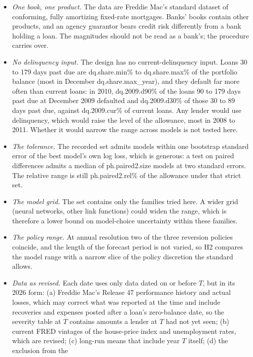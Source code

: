 \begin{itemize}[leftmargin=*, itemsep=2pt]
\item \emph{One book, one product.} The data are Freddie Mac's standard dataset
of conforming, fully amortizing fixed-rate mortgages. Banks' books contain
other products, and an agency guarantor bears credit risk differently from a
bank holding a loan. The magnitudes should not be read as a bank's; the
procedure carries over.
\item \emph{No delinquency input.} The design has no current-delinquency
input. Loans 30 to 179 days past due are \num{dq.share.min}\% to
\num{dq.share.max}\% of the portfolio balance (most in December
\num{dq.share.max_year}), and they default far more often than current loans:
in 2010, \num{dq.2009.d90}\% of the loans 90 to 179 days past due at December
2009 defaulted and \num{dq.2009.d30}\% of those 30 to 89 days past due, against
\num{dq.2009.cur}\% of current loans. Any lender would use delinquency, which
would raise the level of the allowance, most in 2008 to 2011. Whether it
would narrow the range across models is not tested here.
\item \emph{The tolerance.} The recorded set admits models within one
bootstrap standard error of the best model's own log loss, which is generous:
a test on paired differences admits a median of \num{ph.paired2.size} models at
two standard errors. The relative range is still \num{ph.paired2.rel}\% of the
allowance under that strict set.
\item \emph{The model grid.} The set contains only the families tried here.
A wider grid (neural networks, other link functions) could widen the range,
which is therefore a lower bound on model-choice uncertainty within these
families.
\item \emph{The policy range.} At annual resolution two of the three reversion
policies coincide, and the length of the forecast period is not varied, so
H2 compares the model range with a narrow slice of the policy discretion the
standard allows.
\item \emph{Data as revised.} Each date uses only data dated on or before $T$,
but in its 2026 form: (a) Freddie Mac's Release 47 performance history and actual losses,
which may correct what was reported at the time and include recoveries and
expenses posted after a loan's zero-balance date, so the severity table at $T$
contains amounts a lender at $T$ had not yet seen; (b) current FRED vintages
of the house-price index and unemployment rates, which are revised; (c)
long-run means that include year $T$ itself; (d) the exclusion from the

\end{itemize}
